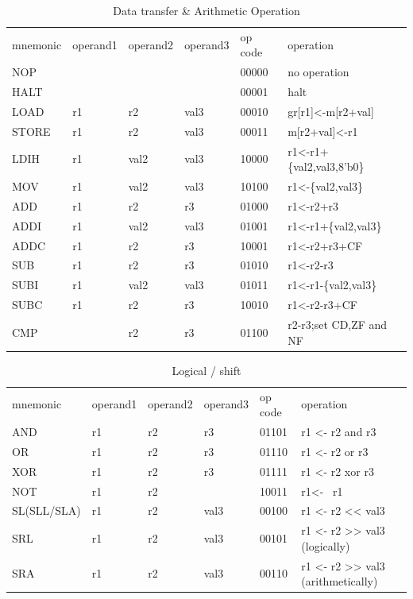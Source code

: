 \documentclass[10pt,a4paper,fleqn]{article}
\begin{document}
\begin{table}[H]
  \def\tc{\color{blue}}
  \centering
  \begin{tabular}{llllll}
    \tc mnemonic&\tc operand1&\tc operand2&\tc operand3&\tc op code&\tc operation \\
     NOP& & & &00000&no operation\\
     HALT& & & &00001&halt\\
     LOAD&r1&r2&val3&00010&gr[r1]<-m[r2+val]\\
     STORE&r1&r2&val3&00011&m[r2+val]<-r1\\
     LDIH&r1&val2&val3&10000&r1<-r1+\{val2,val3,8'b0\}\\
     MOV&r1&val2&val3&10100&r1<-\{val2,val3\}\\
     ADD&r1&r2&r3&01000&r1<-r2+r3\\
     ADDI&r1&val2&val3&01001&r1<-r1+\{val2,val3\}\\
     ADDC&r1&r2&r3&10001&r1<-r2+r3+CF\\
     SUB&r1&r2&r3&01010&r1<-r2-r3\\
     SUBI&r1&val2&val3&01011&r1<-r1-\{val2,val3\}\\
     SUBC&r1&r2&r3&10010&r1<-r2-r3+CF\\
     CMP& &r2&r3&01100&r2-r3;set CD,ZF and NF\\
  \end{tabular}
  \caption{Data transfer \& Arithmetic Operation}
\end{table}

\begin{table}[H]
  \def\tc{\color{blue}}
  \centering
  \begin{tabular}{llllll}
    \tc mnemonic&\tc operand1&\tc operand2&\tc operand3&\tc op code&\tc operation \\
     AND&r1&r2&r3&01101&r1 <- r2 and r3\\
     OR&r1&r2&r3&01110&r1 <- r2 or r3\\
     XOR&r1&r2&r3&01111&r1 <- r2 xor r3\\
     NOT&r1&r2& &10011&r1<- ~r1\\
     SL(SLL/SLA)&r1&r2&val3&00100&r1 <- r2 << val3\\
     SRL&r1&r2&val3&00101&r1 <- r2 >> val3 (logically)\\
     SRA&r1&r2&val3&00110&r1 <- r2 >> val3 (arithmetically)\\
  \end{tabular}
  \caption{Logical / shift}
\end{table}
\end{document}
